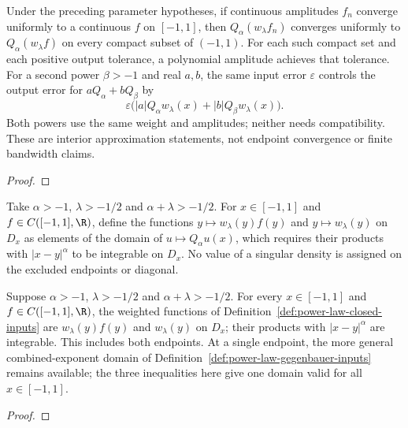 \begin{supporting}
\begin{theorem}
\label{thm:power-law-approximation}
\leanok
Under the preceding parameter hypotheses, if continuous amplitudes $f_n$ converge
uniformly to a continuous $f$ on $[-1,1]$, then $Q_\alpha(w_\lambda f_n)$ converges
uniformly to $Q_\alpha(w_\lambda f)$ on every compact subset of $(-1,1)$.
For each such compact set and each positive output tolerance, a polynomial
amplitude achieves that tolerance. For a second power $\beta>-1$ and real $a,b$,
the same input error $\varepsilon$ controls the output error for
$aQ_\alpha+bQ_\beta$ by
\[
 \varepsilon\bigl(|a|Q_\alpha w_\lambda(x)+|b|Q_\beta w_\lambda(x)\bigr).
\]
Both powers use the same weight and amplitudes; neither needs compatibility.
These are interior approximation statements, not endpoint convergence or
finite bandwidth claims.
\end{theorem}
\begin{proof}
\leanok
\end{proof}

\begin{definition}
\label{def:power-law-closed-inputs}
\leanok
Take $\alpha>-1$, $\lambda>-1/2$ and $\alpha+\lambda>-1/2$.
For $x\in[-1,1]$ and $f\in C([-1,1],\R)$, define the functions
$y\mapsto w_\lambda(y)f(y)$ and $y\mapsto w_\lambda(y)$ on $D_x$
as elements of the domain of $u\mapsto Q_\alpha u(x)$, which requires
their products with $|x-y|^\alpha$ to be integrable on $D_x$.
No value of a singular density is assigned on the excluded endpoints or diagonal.
\end{definition}
\begin{theorem}
\label{thm:power-law-closed-inputs}
\leanok
Suppose $\alpha>-1$, $\lambda>-1/2$ and $\alpha+\lambda>-1/2$.
For every $x\in[-1,1]$ and $f\in C([-1,1],\R)$, the weighted functions of
Definition~\ref{def:power-law-closed-inputs} are $w_\lambda(y)f(y)$ and
$w_\lambda(y)$ on $D_x$; their products with $|x-y|^\alpha$ are integrable.
This includes both endpoints. At a single endpoint, the more general
combined-exponent domain of Definition~\ref{def:power-law-gegenbauer-inputs}
remains available; the three inequalities here give one domain valid for all
$x\in[-1,1]$.
\end{theorem}
\begin{proof}
\leanok
\end{proof}


\end{supporting}
